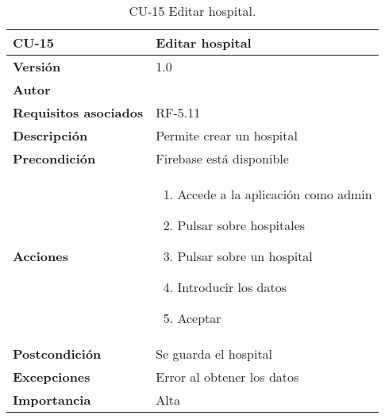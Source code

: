 \begin{table}[p]
	\centering
	\begin{tabularx}{\linewidth}{ p{} p{} }
		\toprule
		\textbf{CU-15}    & \textbf{Editar hospital}\\
		\toprule
		\textbf{Versión}              & 1.0    \\
		\textbf{Autor}                & {\nombre} \\
		\textbf{Requisitos asociados} & RF-5.11 \\
		\textbf{Descripción}          & Permite crear un hospital \\
		\textbf{Precondición}         & Firebase está disponible \\
		\textbf{Acciones}             &
		\begin{enumerate}
			\def\labelenumi{\arabic{enumi}.}
			\tightlist
			\item Accede a la aplicación como admin
			\item Pulsar sobre hospitales
			\item Pulsar sobre un hospital
			\item Introducir los datos
			\item Aceptar
		\end{enumerate}\\
		\textbf{Postcondición}        & Se guarda el hospital\\
		\textbf{Excepciones}          & Error al obtener los datos \\
		\textbf{Importancia}          & Alta \\
		\bottomrule
	\end{tabularx}
	\caption{CU-15 Editar hospital.}
\end{table}

